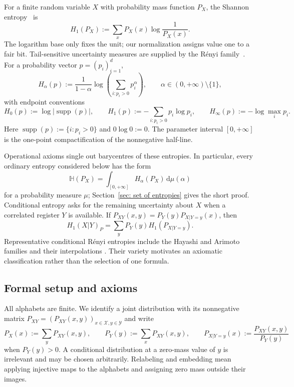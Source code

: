 \documentclass[aps,pra,11pt,onecolumn,nofootinbib,tightenlines]{revtex4-2}
\theoremstyle{definition}
\def \d {\mathrm{d}}
\renewcommand{\H}{\mathbb{H}}
\newcommand{\X}{\mathcal{X}}
\newcommand{\Y}{\mathcal{Y}}
\begin{document}
For a finite random variable $X$ with probability mass function $P_X$, the
Shannon entropy~\cite{shannon1948mathematical} is
\begin{equation}
 H_1(P_X):=\sum_x P_X(x)\log\frac{1}{P_X(x)}.
 \label{eq:shannon-introduction}
\end{equation}
The logarithm base only fixes the unit; our normalization assigns value one to
a fair bit.  Tail-sensitive uncertainty measures are supplied by the
R\'enyi family~\cite{renyi61}.  For a probability vector $p=(p_i)_{i=1}^d$,
\begin{equation}
 H_\alpha(p):=\frac{1}{1-\alpha}
 \log\!\left(\sum_{i:p_i>0}p_i^\alpha\right),
 \qquad \alpha\in(0,+\infty)\setminus\{1\},
 \label{eq:renyi-introduction}
\end{equation}
with endpoint conventions
\begin{equation}
 H_0(p):=\log|\operatorname{supp}(p)|,\qquad
 H_1(p):=-\sum_{i:p_i>0}p_i\log p_i,\qquad
 H_\infty(p):=-\log\max_i p_i .
 \label{eq:renyi-endpoints-introduction}
\end{equation}
Here $\operatorname{supp}(p):=\{i:p_i>0\}$ and $0\log0:=0$.  The
parameter interval $[0,+\infty]$ is the one-point compactification of the
nonnegative half-line.

Operational axioms single out barycentres of these entropies.  In particular,
every ordinary entropy considered below has the form
\begin{equation}
 \H(P_X)=\int_{[0,+\infty]}H_\alpha(P_X)\,\d\mu(\alpha)
 \label{eq:EntropyBarycentre}
\end{equation}
for a probability measure $\mu$; Section~\ref{sec: set of entropies} gives the
short proof.  Conditional entropy asks for the remaining uncertainty about
$X$ when a correlated register $Y$ is available.  If
$P_{XY}(x,y)=P_Y(y)P_{X|Y=y}(x)$, then
\begin{equation}
 H_1(X|Y)_P=\sum_yP_Y(y)H_1(P_{X|Y=y}).
\end{equation}
Representative conditional R\'enyi entropies include the Hayashi and Arimoto
families and their interpolations
\cite{arimoto1977information,hayashi2011exponential,hayashi2016equivocations}.
Their variety motivates an axiomatic classification rather than the selection
of one formula.

\subsection*{Formal setup and axioms}

All alphabets are finite.  We identify a joint distribution with its
nonnegative matrix
$P_{XY}=(P_{XY}(x,y))_{x\in\X,y\in\Y}$ and write
\begin{equation}
 P_X(x):=\sum_yP_{XY}(x,y),\qquad
 P_Y(y):=\sum_xP_{XY}(x,y),\qquad
 P_{X|Y=y}(x):=\frac{P_{XY}(x,y)}{P_Y(y)}
 \label{eq:joint-marginal-conditional}
\end{equation}
when $P_Y(y)>0$.  A conditional distribution at a zero-mass value of $y$ is
irrelevant and may be chosen arbitrarily.  Relabeling and embedding mean
applying injective maps to the alphabets and assigning zero mass outside their
images.
\end{document}

